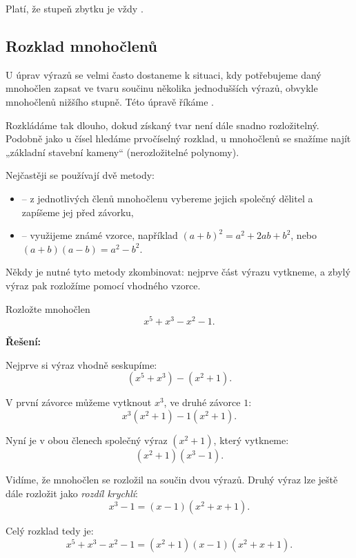 \documentclass[12pt,a4paper]{article}
\begin{document}
Platí, že stupeň zbytku je vždy .  

\newpage
\subsection{Rozklad mnohočlenů}

U úprav výrazů se velmi často dostaneme k situaci, kdy potřebujeme daný mnohočlen zapsat ve tvaru součinu několika jednodušších výrazů, obvykle mnohočlenů nižšího stupně.  
Této úpravě říkáme .  

\noindent
Rozkládáme tak dlouho, dokud získaný tvar není dále snadno rozložitelný.  
Podobně jako u čísel hledáme prvočíselný rozklad, u mnohočlenů se snažíme najít „základní stavební kameny“ (nerozložitelné polynomy).  

\medskip
Nejčastěji se používají dvě metody:
\begin{itemize}
    \item {} – z jednotlivých členů mnohočlenu vybereme jejich společný dělitel a zapíšeme jej před závorku,
    \item {} – využijeme známé vzorce, například \((a+b)^2 = a^2 + 2ab + b^2\), nebo \((a+b)(a-b) = a^2 - b^2\).
\end{itemize}

Někdy je nutné tyto metody zkombinovat: nejprve část výrazu vytkneme, a zbylý výraz pak rozložíme pomocí vhodného vzorce.

\begin{examplebox}
Rozložte mnohočlen
\[
x^5 + x^3 - x^2 - 1.
\]

\textbf{Řešení:}

Nejprve si výraz vhodně seskupíme:
\[
(x^5 + x^3) - (x^2 + 1).
\]

V první závorce můžeme vytknout $x^3$, ve druhé závorce $1$:
\[
x^3(x^2+1) - 1(x^2+1).
\]

Nyní je v obou členech společný výraz \((x^2+1)\), který vytkneme:
\[
(x^2+1)(x^3 - 1).
\]

Vidíme, že mnohočlen se rozložil na součin dvou výrazů. Druhý výraz lze ještě dále rozložit jako \emph{rozdíl krychlí}:
\[
x^3 - 1 = (x-1)(x^2+x+1).
\]

Celý rozklad tedy je:
\[
x^5 + x^3 - x^2 - 1 = (x^2+1)(x-1)(x^2+x+1).
\]
\end{examplebox}
\end{document}
